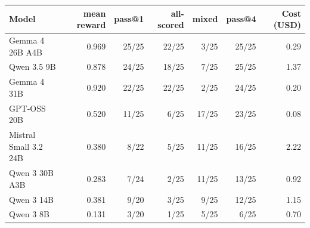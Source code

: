 \begin{tabular}{lrrrrrr}
\toprule
Model & mean reward & pass@1 & all-scored & mixed & pass@4 & Cost (USD) \\
\midrule
Gemma 4 26B A4B & 0.969 & 25/25 & 22/25 & 3/25 & 25/25 & 0.29 \\
Qwen 3.5 9B & 0.878 & 24/25 & 18/25 & 7/25 & 25/25 & 1.37 \\
Gemma 4 31B & 0.920 & 22/25 & 22/25 & 2/25 & 24/25 & 0.20 \\
GPT-OSS 20B & 0.520 & 11/25 & 6/25 & 17/25 & 23/25 & 0.08 \\
Mistral Small 3.2 24B & 0.380 & 8/22 & 5/25 & 11/25 & 16/25 & 2.22 \\
Qwen 3 30B A3B & 0.283 & 7/24 & 2/25 & 11/25 & 13/25 & 0.92 \\
Qwen 3 14B & 0.381 & 9/20 & 3/25 & 9/25 & 12/25 & 1.15 \\
Qwen 3 8B & 0.131 & 3/20 & 1/25 & 5/25 & 6/25 & 0.70 \\
\bottomrule
\end{tabular}

